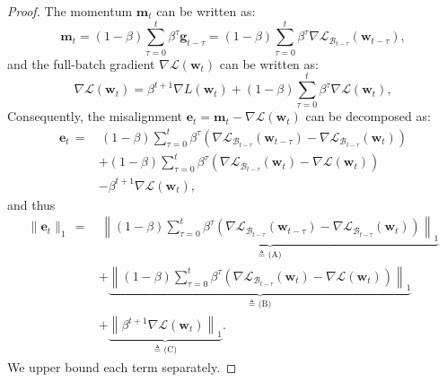 \documentclass[10pt,a4paper]{amsart}
\def\be{{\mathbf e}}
\def\bg{{\mathbf g}}
\def\bm{{\mathbf m}}
\def\bw{{\mathbf w}}
\def\gB{{\mathcal{B}}}
\newcommand{\Ls}{\mathcal{L}}
\begin{document}
\begin{proof}
    The momentum $\bm_t$ can be written as: \[
    \bm_t = (1-\beta) \sum_{\tau=0}^t \beta^\tau \bg_{t-\tau} = (1-\beta) \sum_{\tau=0}^t \beta^\tau \nabla \Ls_{\gB_{t-\tau}} (\bw_{t-\tau}),
    \]
    and the full-batch gradient $\nabla \Ls (\bw_t)$ can be written as: \[
    \nabla \Ls (\bw_t) = \beta^{t+1} \nabla L(\bw_t) + (1-\beta) \sum_{\tau=0}^t \beta^\tau \nabla \Ls (\bw_{t}),
    \]
    Consequently, the misalignment $\be_t = \bm_t - \nabla \Ls(\bw_t)$ can be decomposed as:
    \begin{align*}
    \be_t \,=&\,  (1-\beta) \sum_{\tau=0}^t \beta^\tau (\nabla \Ls_{\gB_{t-\tau}} (\bw_{t-\tau}) - \nabla \Ls_{\gB_{t-\tau}} (\bw_t)) \\
    &+ (1-\beta) \sum_{\tau=0}^t \beta^\tau (\nabla \Ls_{\gB_{t-\tau}} (\bw_t) - \nabla \Ls (\bw_t)) \\
    &- \beta^{t+1} \nabla \Ls (\bw_t),
    \end{align*}
    and thus
    \begin{align*}
    \|\be_t\|_1 \,=&\,  \underbrace{\left\| (1-\beta) \sum_{\tau=0}^t \beta^\tau (\nabla \Ls_{\gB_{t-\tau}} (\bw_{t-\tau}) - \nabla \Ls_{\gB_{t-\tau}} (\bw_t)) \right\|_1}_{\triangleq\textrm{ (A)}} \\
    &+ \underbrace{\left\| (1-\beta) \sum_{\tau=0}^t \beta^\tau (\nabla \Ls_{\gB_{t-\tau}} (\bw_t) - \nabla \Ls (\bw_t)) \right\|_1}_{\triangleq\textrm{ (B)}}\\
    & + \underbrace{\left\| \beta^{t+1} \nabla \Ls (\bw_t) \right\|_1}_{\triangleq\textrm{ (C)}}.
    \end{align*}
    We upper bound each term separately.


\end{proof}
\end{document}
